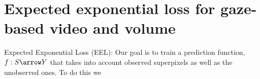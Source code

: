 \chapter{Expected exponential loss for gaze-based video and volume}
\label{eel} %


Expected Exponential Loss (EEL): Our goal is to train a prediction function, $f : S \arrow Y$
that takes into account observed superpixels as well as the unobserved ones. To do this we


